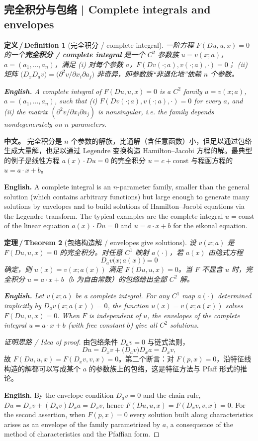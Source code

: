 \documentclass[UTF8,11pt,a4paper]{ctexart}
\newcommand{\APS}[2]{\par\noindent\textbf{中文。} #1\par\noindent\textbf{English.} #2\par\smallskip}
\newcommand{\EN}[1]{\par\noindent \textbf{English.} #1\par}
\newtheorem{definition}{定义\,/\,Definition}[section]
\newtheorem{theorem}[definition]{定理\,/\,Theorem}
\begin{document}
\subsection{完全积分与包络 | Complete integrals and envelopes}
\begin{definition}[完全积分 / complete integral]\label{def:complete}
一阶方程 $F(Du,u,x)=0$ 的一个\textbf{完全积分 / complete integral} 是一个 $C^2$ 参数族 $u=v(x;a)$，$a=(a_1,\dots,a_n)$，满足
(i) 对每个参数 $a$，$F(Dv(\cdot;a),v(\cdot;a),\cdot)=0$；
(ii) 矩阵 $\bigl(D_xD_av\bigr)=\bigl(\partial^2v/\partial x_i\partial a_j\bigr)$ 非奇异，即参数族``非退化地''依赖 $n$ 个参数。
\EN{A complete integral of $F(Du,u,x)=0$ is a $C^2$ family $u=v(x;a)$, $a=(a_1,\dots,a_n)$, such that (i) $F(Dv(\cdot;a),v(\cdot;a),\cdot)=0$ for every $a$, and (ii) the matrix $(\partial^2v/\partial x_i\partial a_j)$ is nonsingular, i.e. the family depends nondegenerately on $n$ parameters.}
\end{definition}

\APS{完全积分是 $n$ 个参数的解族，比通解（含任意函数）小，但足以通过包络生成大量解，也足以通过 Legendre 变换构造 Hamilton--Jacobi 方程的解。最典型的例子是线性方程 $a(x)\cdot Du=0$ 的完全积分 $u=c+\text{const}$ 与程函方程的 $u=a\cdot x+b$。}{A complete integral is an $n$-parameter family, smaller than the general solution (which contains arbitrary functions) but large enough to generate many solutions by envelopes and to build solutions of Hamilton--Jacobi equations via the Legendre transform. The typical examples are the complete integral $u=\text{const}$ of the linear equation $a(x)\cdot Du=0$ and $u=a\cdot x+b$ for the eikonal equation.}

\begin{theorem}[包络构造解 / envelopes give solutions]\label{thm:envelope}
设 $v(x;a)$ 是 $F(Du,u,x)=0$ 的完全积分。对任意 $C^1$ 映射 $a(\cdot)$，若 $a(x)$ 由隐式方程
\[
D_av\bigl(x;a(x)\bigr)=0
\]
确定，则 $u(x)=v(x;a(x))$ 满足 $F(Du,u,x)=0$。当 $F$ 不显含 $u$ 时，完全积分 $u=a\cdot x+b$（$b$ 为自由常数）的包络给出全部 $C^2$ 解。
\EN{Let $v(x;a)$ be a complete integral. For any $C^1$ map $a(\cdot)$ determined implicitly by $D_av(x;a(x))=0$, the function $u(x)=v(x;a(x))$ solves $F(Du,u,x)=0$. When $F$ is independent of $u$, the envelopes of the complete integral $u=a\cdot x+b$ (with free constant $b$) give all $C^2$ solutions.}
\end{theorem}

\begin{proof}[证明思路 / Idea of proof]
由包络条件 $D_av=0$ 与链式法则，
\[
Du=D_xv+\bigl(D_av\bigr)D_xa=D_xv,
\]
故 $F(Du,u,x)=F(D_xv,v,x)=0$。第二个断言：对 $F(p,x)=0$，沿特征线构造的解都可以写成某个 $a$ 的参数族上的包络，这是特征方法与 Pfaff 形式的推论。\EN{By the envelope condition $D_av=0$ and the chain rule, $Du=D_xv+(D_av)D_xa=D_xv$, hence $F(Du,u,x)=F(D_xv,v,x)=0$. For the second assertion, when $F(p,x)=0$ every solution built along characteristics arises as an envelope of the family parametrized by $a$, a consequence of the method of characteristics and the Pfaffian form.}
\end{proof}
\end{document}
